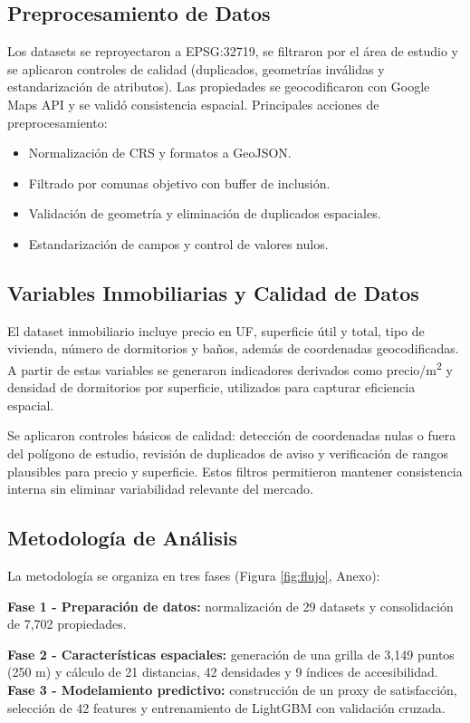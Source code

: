 \documentclass[11pt,letterpaper]{article}
\begin{document}
\subsection{Preprocesamiento de Datos}
Los datasets se reproyectaron a EPSG:32719, se filtraron por el área de estudio y se aplicaron controles de calidad (duplicados, geometrías inválidas y estandarización de atributos). Las propiedades se geocodificaron con Google Maps API y se validó consistencia espacial.
Principales acciones de preprocesamiento:
\begin{itemize}
    \item Normalización de CRS y formatos a GeoJSON.
    \item Filtrado por comunas objetivo con buffer de inclusión.
    \item Validación de geometría y eliminación de duplicados espaciales.
    \item Estandarización de campos y control de valores nulos.
\end{itemize}

\subsection{Variables Inmobiliarias y Calidad de Datos}
El dataset inmobiliario incluye precio en UF, superficie útil y total, tipo de vivienda, número de dormitorios y baños, además de coordenadas geocodificadas. A partir de estas variables se generaron indicadores derivados como precio/m\textsuperscript{2} y densidad de dormitorios por superficie, utilizados para capturar eficiencia espacial.

Se aplicaron controles básicos de calidad: detección de coordenadas nulas o fuera del polígono de estudio, revisión de duplicados de aviso y verificación de rangos plausibles para precio y superficie. Estos filtros permitieron mantener consistencia interna sin eliminar variabilidad relevante del mercado.

\subsection{Metodología de Análisis}
La metodología se organiza en tres fases (Figura \ref{fig:flujo}, Anexo):

\textbf{Fase 1 - Preparación de datos:} normalización de 29 datasets y consolidación de 7,702 propiedades.

\textbf{Fase 2 - Características espaciales:} generación de una grilla de 3,149 puntos (250 m) y cálculo de 21 distancias, 42 densidades y 9 índices de accesibilidad.
\textbf{Fase 3 - Modelamiento predictivo:} construcción de un proxy de satisfacción, selección de 42 features y entrenamiento de LightGBM con validación cruzada.
\end{document}

